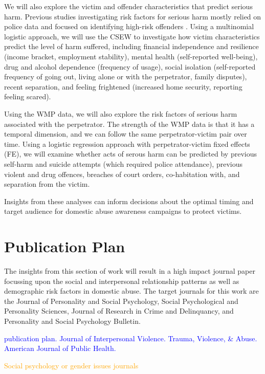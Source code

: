 \documentclass[11pt, a4paper]{article}
\newcommand{\TM}[1] {{\textcolor{orange}{#1}}}
\newcommand{\AT}[1] {{\textcolor{blue}{#1}}}
\begin{document}
 We will also explore the victim and offender characteristics that predict serious harm. Previous studies investigating risk factors for serious harm mostly relied on police data and focused on identifying high-risk offenders \cite{thornton}. Using a multinomial logistic approach, we will use the CSEW to investigate how victim characteristics predict the level of harm suffered, including financial independence and resilience (income bracket, employment stability), mental health (self-reported well-being), drug and alcohol dependence (frequency of usage), social isolation (self-reported frequency of going out, living alone or with the perpetrator, family disputes), recent separation, and feeling frightened (increased home security, reporting feeling scared).
 
 Using the WMP data, we will also explore the risk factors of serious harm associated with the perpetrator. The strength of the WMP data is that it has a temporal dimension, and we can follow the same perpetrator-victim pair over time. Using a logistic regression approach with perpetrator-victim fixed effects (FE), we will examine whether acts of serous harm can be predicted by previous self-harm and suicide attempts (which required police attendance), previous violent and drug offences, breaches of court orders, co-habitation with, and separation from the victim. 
 
 Insights from these analyses can inform decisions about the optimal timing and target audience for domestic abuse awareness campaigns to protect victims. 
 
 \section{Publication Plan}
 
 The insights from this section of work will result in a high impact journal paper focussing upon the social and interpersonal relationship patterns as well as demographic risk factors in domestic abuse. The target journals for this work are the Journal of Personality and Social Psychology, Social Psychological and Personality Sciences, Journal of Research in Crime and Delinquancy, and Personality and Social Psychology Bulletin.
 
 \AT{publication plan. Journal of Interpersonal Violence. Trauma, Violence, \& Abuse. American Journal of Public Health.}
 
 \TM{Social psychology or gender issues journals}


%
%
\end{document}
